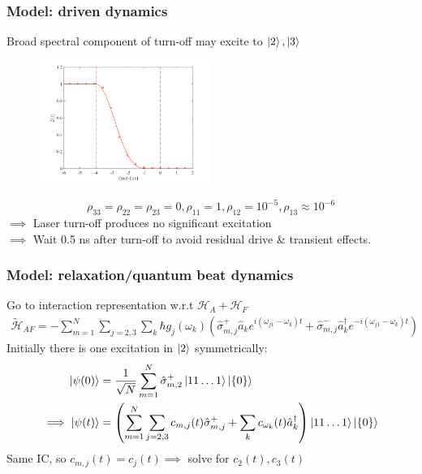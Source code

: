 \documentclass{beamer}
\theoremstyle{definition}
\newcommand{\lp}{\left(}
\newcommand{\rp}{\right)}
\newcommand{\f}[2]{\frac{#1}{#2}}
\begin{document}
\begin{frame}
	\frametitle{Model: driven dynamics}
	Broad spectral component of turn-off may excite to $\ket{2},\ket{3}$
	\begin{figure}[!htb]
		\centering
		\includegraphics[width = 0.5\textwidth]{turn-off.png}
	\end{figure}
	$$\rho_{33}=\rho_{22} = \rho_{23} = 0, \rho_{11}=1, \rho_{12} = 10^{-5}, \rho_{13} \approx 10^{-6}$$
$\implies$ Laser turn-off produces no significant excitation \\
$\implies$ Wait 0.5 ns after turn-off to avoid residual drive \& transient effects.
\end{frame}




\begin{frame}
	\frametitle{Model: relaxation/quantum beat dynamics}
	Go to interaction representation w.r.t $\mathcal{H}_A + \mathcal{H}_F$ 
	\begin{align*}
	\widetilde{\mathcal{H}}_{AF} = -\sum^N_{m=1}\sum_{j=2,3} \sum_k \hbar g_j(\omega_k)\lp \hat \sigma_{m,j}^+ \hat a_k e^{i(\omega_{j1} - \omega_k) t} + \hat \sigma^-_{m,j} \hat a^\dagger_ke^{-i(\omega_{j1} - \omega_k) t}\rp
	\end{align*}
	Initially there is one excitation in $\ket{2}$ symmetrically:  
	\begin{align*}
	\ket{\psi(0)} &= \f{1}{\sqrt{N}} \sum^N_{m=1} \hat \sigma^+_{m,2} \ket{11\dots 1} \ket{\{0\}}\\
	\implies \ket{\psi(t)} &= \lp \sum^N_{m=1}\sum_{j=2,3} c_{m,j}(t)\hat \sigma_{m,j}^+ + \sum_k c_{\omega_k}(t)\hat a_k^\dagger \rp \ket{11\dots 1} \ket{\{0\}}
	\end{align*}
	Same IC, so $c_{m,j}(t) = c_{j}(t) \implies$ solve for $c_2(t), c_3(t)$ 
\end{frame}
\end{document}

